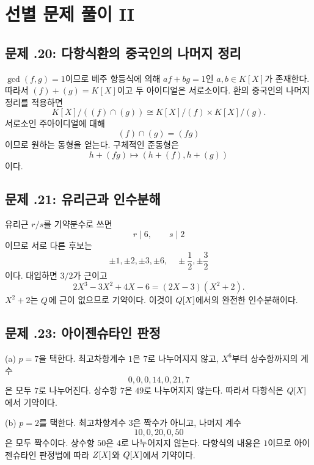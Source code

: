 \section{선별 문제 풀이 II}
\label{sec:polynomial-solutions-b}

\subsection*{문제 \thechapter.20: 다항식환의 중국인의 나머지 정리}

\begin{solution}
$\gcd(f,g)=1$이므로 베주 항등식에 의해 $af+bg=1$인 $a,b\in K[X]$가 존재한다. 따라서 $(f)+(g)=K[X]$이고 두 아이디얼은 서로소이다. 환의 중국인의 나머지 정리를 적용하면
\[
 K[X]/((f)\cap(g))
 \cong K[X]/(f)\times K[X]/(g).
\]
서로소인 주아이디얼에 대해
\[
 (f)\cap(g)=(fg)
\]
이므로 원하는 동형을 얻는다. 구체적인 준동형은
\[
 h+(fg)\longmapsto(h+(f),h+(g))
\]
이다.
\end{solution}

\subsection*{문제 \thechapter.21: 유리근과 인수분해}

\begin{solution}
유리근 $r/s$를 기약분수로 쓰면
\[
 r\mid6,\qquad s\mid2
\]
이므로 서로 다른 후보는
\[
 \pm1,\pm2,\pm3,\pm6,
 \quad
 \pm\frac12,\pm\frac32
\]
이다. 대입하면 $3/2$가 근이고
\[
 2X^3-3X^2+4X-6=(2X-3)(X^2+2).
\]
$X^2+2$는 $Q$에 근이 없으므로 기약이다. 이것이 $Q[X]$에서의 완전한 인수분해이다.
\end{solution}

\subsection*{문제 \thechapter.23: 아이젠슈타인 판정}

\begin{solution}
(a) $p=7$을 택한다. 최고차항계수 $1$은 $7$로 나누어지지 않고, $X^6$부터 상수항까지의 계수
\[
  0,0,0,14,0,21,7
\]
은 모두 $7$로 나누어진다. 상수항 $7$은 $49$로 나누어지지 않는다. 따라서 다항식은 $Q[X]$에서 기약이다.

(b) $p=2$를 택한다. 최고차항계수 $3$은 짝수가 아니고, 나머지 계수
\[
  10,0,20,0,50
\]
은 모두 짝수이다. 상수항 $50$은 $4$로 나누어지지 않는다. 다항식의 내용은 $1$이므로 아이젠슈타인 판정법에 따라 $Z[X]$와 $Q[X]$에서 기약이다.
\end{solution}

